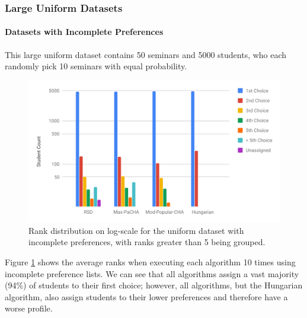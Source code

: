 \subsubsection{Large Uniform Datasets}

\paragraph{Datasets with Incomplete Preferences}
This large uniform dataset contains 50 seminars and 5000 students, who each randomly pick 10 seminars with equal probability.

\begin{figure}[h!]
  \centering
    \includegraphics[width=0.75\linewidth]{assets/plots/uniform_incompl_distr.pdf}
    \caption{Rank distribution on log-scale for the uniform dataset with incomplete preferences, with ranks greater than 5 being grouped.}
    \label{fig:uniform-incomplete-distribution}
\end{figure}

Figure \ref{fig:uniform-incomplete-distribution} shows the average ranks when executing each algorithm 10 times using incomplete preference lists. We can see that all algorithms assign a vast majority (94\%) of students to their first choice; however, all algorithms, but the Hungarian algorithm, also assign students to their lower preferences and therefore have a worse profile.

